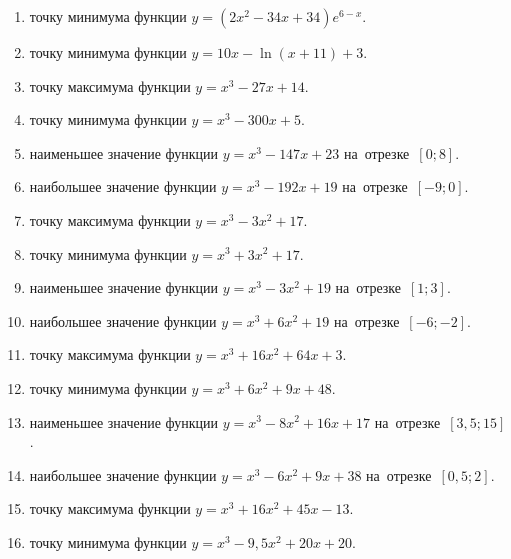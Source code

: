 \documentclass[a4paper,10pt]{article}
\begin{document}
\begin{enumerate}
\item {} точку минимума функции $y=\left(2x^2-34x+34\right){{e}^{6-x}}$.

\item {} точку минимума функции $y=10x-\ln \left(x+11\right)+3$.

\item {} точку максимума функции $y=x^3 -27x +14$.

\item {} точку минимума функции $y=x^3 -300x+5$.

\item {} наименьшее значение функции $y=x^3 -147x+23$ на~отрезке~$\left[0;8\right]$.

\item {} наибольшее значение функции $y=x^3 -192x+19$ на~отрезке~$\left[-9;0\right]$.

\item {} точку максимума функции $y=x^3 -3x^2+17$.

\item {} точку минимума функции $y=x^3 +3x^2+17$.

\item {} наименьшее значение функции $y=x^3 -3x^2+19$ на~отрезке~$\left[1;3\right]$.

\item {} наибольшее значение функции $y=x^3 +6x^2+19$ на~отрезке~$\left[-6;-2\right]$.

\item {} точку максимума функции $y=x^3 +16x^2+64x+3$.

\item {} точку минимума функции $y=x^3 +6x^2+9x+48$.

\item {} наименьшее значение функции $y=x^3 -8x^2+16x+17$ на~отрезке~$\left[3,5;15\right]$.

\item {} наибольшее значение функции $y=x^3 -6x^2+9x+38$ на~отрезке~$\left[0,5;2\right]$.

\item {} точку максимума функции $y=x^3 +16x^2+45x-13$.

\item {} точку минимума функции $y=x^3 -9,5x^2+20x+20$.


\end{enumerate}
\end{document}
